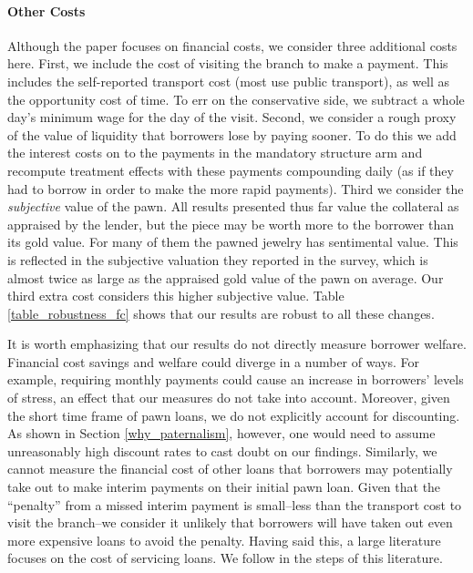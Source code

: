 \documentclass[12pt, a4paper, colorinlistoftodos]{article}
\begin{document}
\paragraph*{Other Costs} Although the paper focuses on financial costs, we consider three additional costs here. First, we include the cost of visiting the branch to make a payment. This includes the self-reported transport cost (most use public transport), as well as the opportunity cost of time. To err on the conservative side, we subtract a whole day's minimum wage for the day of the visit. 
Second, we consider a rough proxy of the value of liquidity that borrowers lose by paying sooner. To do this we add the interest costs on to the payments in the mandatory structure arm and recompute treatment effects with these payments compounding daily (as if they had to borrow in order to make the more rapid payments). Third we consider the \emph{subjective} value of the pawn. All results presented thus far value the collateral as appraised by the lender, but the piece may be worth more to the borrower than its gold value. For many of them the pawned jewelry has sentimental value. This is reflected in the subjective valuation they reported in the survey, which is almost twice as large as the appraised gold value of the pawn on average. Our third extra cost considers this higher subjective value. Table \ref{table_robustness_fc} shows that our results are robust to all these changes. 

It is worth emphasizing that our results do not directly measure borrower welfare. 
Financial cost savings and welfare could diverge in a number of ways.
For example, requiring monthly payments could cause an increase in borrowers' levels of stress, an effect that our measures do not take into account.
Moreover, given the short time frame of pawn loans, we do not explicitly account for discounting.
As shown in Section \ref{why_paternalism}, however, one would need to assume unreasonably high discount rates to cast doubt on our findings. 
Similarly, we cannot measure the financial cost of other loans that borrowers may potentially take out to make interim payments on their initial pawn loan. 
Given that the ``penalty'' from a missed interim payment is small--less than the transport cost to visit the branch--we consider it unlikely that borrowers will have taken out even more expensive loans to avoid the penalty.
Having said this, a large literature focuses on the cost of servicing loans. We follow in the steps of this literature. 
\end{document}
